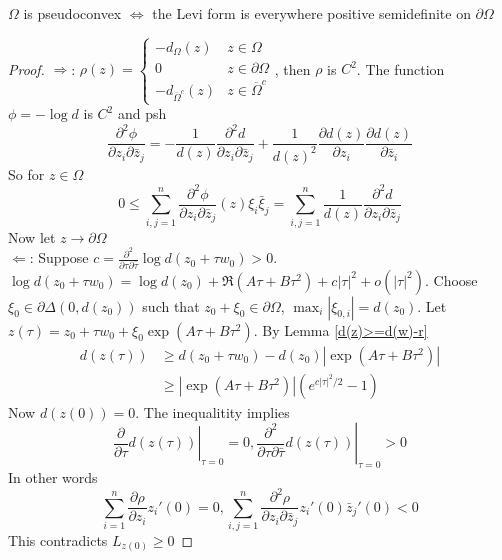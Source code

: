 \documentclass[../main.tex]{subfiles}
\begin{document}
\begin{proposition}
$\Omega$ is pseudoconvex $\iff$ the Levi form is everywhere positive semidefinite on $\partial\Omega$
\end{proposition}

\begin{proof}
$\Rightarrow$: $\rho(z)=\begin{cases}
-d_\Omega(z)&z\in\Omega \\
0&z\in\partial\Omega \\
-d_{\overline\Omega^c}(z)&z\in\overline\Omega^c
\end{cases}$, then $\rho$ is $C^2$. The function $\phi=-\log d$ is $C^2$ and psh
\[\frac{\partial^2\phi}{\partial z_i\partial\bar z_j}=-\frac{1}{d(z)}\frac{\partial^2 d}{\partial z_i\partial\bar z_j}+\frac{1}{d(z)^2}\frac{\partial d(z)}{\partial z_i}\frac{\partial d(z)}{\partial\bar z_i}\]
So for $z\in\Omega$
\[0\leq\sum_{i,j=1}^n\frac{\partial^2\phi}{\partial z_i\partial\bar z_j}(z)\xi_i\bar\xi_j=\sum_{i,j=1}^n\frac{1}{d(z)}\frac{\partial^2 d}{\partial z_i\partial\bar z_j}\]
Now let $z\to\partial \Omega$ \\
$\Leftarrow$: Suppose $c=\frac{\partial^2}{\partial\tau\partial\bar\tau}\log d(z_0+\tau w_0)>0$. $\log d(z_0+\tau w_0)=\log d(z_0)+\Re(A\tau+B\tau^2)+c|\tau|^2+o(|\tau|^2)$. Choose $\xi_0\in\partial\Delta(0,d(z_0))$ such that $z_0+\xi_0\in\partial\Omega$, $\max_i|\xi_{0,i}|=d(z_0)$. Let $z(\tau)=z_0+\tau w_0+\xi_0\exp(A\tau+B\tau^2)$. By Lemma \ref{d(z)>=d(w)-r}
\begin{align*}
d(z(\tau))&\geq d(z_0+\tau w_0)-d(z_0)|\exp(A\tau+B\tau^2)| \\
&\geq|\exp(A\tau+B\tau^2)|(e^{c|\tau|^2/2}-1)
\end{align*}
Now $d(z(0))=0$. The inequalitity implies
\[\left.\frac{\partial}{\partial\tau}d(z(\tau))\right|_{\tau=0}=0,\left.\frac{\partial^2}{\partial\tau\partial\bar\tau}d(z(\tau))\right|_{\tau=0}>0\]
In other words
\[\sum_{i=1}^n\frac{\partial\rho}{\partial z_i}z_i'(0)=0,\sum_{i,j=1}^n\frac{\partial^2\rho}{\partial z_i\partial\bar z_j}z_i'(0)\bar z_j'(0)<0\]
This contradicts $L_{z(0)}\geq0$
\end{proof}
\end{document}
